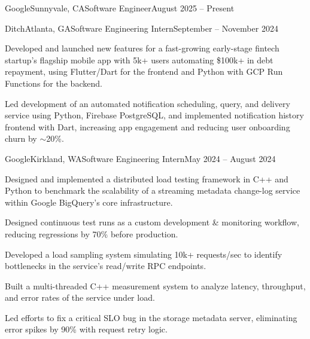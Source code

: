 \documentclass{article}
\begin{document}
\thispagestyle{empty}


\begin{flushleft}



    \begin{experiencenolist}{Google}{Sunnyvale, CA}{Software Engineer}{August 2025 -- Present}\end{experiencenolist}

    \begin{experience}{Ditch}{Atlanta, GA}{Software Engineering Intern}{September -- November 2024}
        \item Developed and launched new features for a fast-growing early-stage fintech startup's flagship mobile app with 5k+ users automating \$100k+ in debt repayment, using Flutter/Dart for the frontend and Python with GCP Run Functions for the backend.
        \item Led development of an automated notification scheduling, query, and delivery service using Python, Firebase PostgreSQL, and implemented notification history frontend with Dart, increasing app engagement and reducing user onboarding churn by $\sim$20\%.
    \end{experience}

    \begin{experience}{Google}{Kirkland, WA}{Software Engineering Intern}{May 2024 -- August 2024}
        \item Designed and implemented a distributed load testing framework in C++ and Python to benchmark the scalability of a streaming metadata change-log service within Google BigQuery's core infrastructure.
        \item Designed continuous test runs as a custom development \& monitoring workflow, reducing regressions by 70\% before production.
        \item Developed a load sampling system simulating 10k+ requests/sec to identify bottlenecks in the service's read/write RPC endpoints.
        \item Built a multi-threaded C++ measurement system to analyze latency, throughput, and error rates of the service under load.
        \item Led efforts to fix a critical SLO bug in the storage metadata server, eliminating error spikes by 90\% with request retry logic.
    \end{experience}


\end{flushleft}
\end{document}
